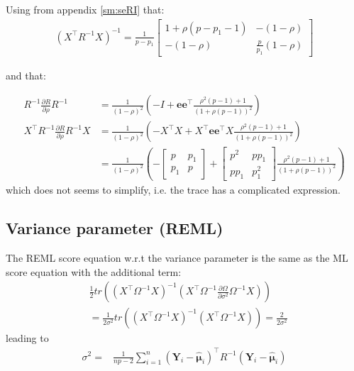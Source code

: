 \documentclass[12pt]{article}
\newcommand\Ve{\mathbf{e}}
\newcommand\VY{\mathbf{Y}}
\newcommand\Vmu{\boldsymbol{\mu}}
\newcommand\trans[1]{{#1}^\intercal}%
\begin{document}
Using from appendix \ref{sm:seRI} that:
\begin{align*}
\left(\trans{X}R^{-1}X\right)^{-1} = \frac{1}{p-p_1} \begin{bmatrix} 1+\rho (p-p_1-1)
                  & -(1-\rho)
                  \\ -(1-\rho)
                  & \frac{p}{p_1}(1-\rho)
                  \end{bmatrix}
\end{align*}

and that:

\begin{align*}
R^{-1} \frac{\partial R}{\partial\rho} R^{-1} &= \frac{1}{(1-\rho)^2} \left(-I + \Ve\trans{\Ve} \frac{\rho^2(p-1) + 1}{(1+\rho(p-1))^2}\right) \\
\trans{X}R^{-1} \frac{\partial R}{\partial\rho} R^{-1} X &= \frac{1}{(1-\rho)^2} \left(-\trans{X}X + \trans{X}\Ve\trans{\Ve}X \frac{\rho^2(p-1) + 1}{(1+\rho(p-1))^2}\right)  \\
&= \frac{1}{(1-\rho)^2} \left(-\begin{bmatrix} p
                  & p_1
                  \\ p_1
                  & p
                  \end{bmatrix}
                  + \begin{bmatrix} p^2
                  & p p_1
                  \\ p p_1
                  & p_1^2
                  \end{bmatrix} \frac{\rho^2(p-1) + 1}{(1+\rho(p-1))^2}\right) 
\end{align*}
which does not seems to simplify, i.e. the trace has a complicated expression.

\subsection{Variance parameter (REML)}
\label{sec:orgabe1d79}

The REML score equation w.r.t the variance parameter is the same as the ML score equation with the additional term:
\begin{align*}
&\frac{1}{2} tr\left(\left(\trans{X}\Omega^{-1}X\right)^{-1} \left(\trans{X}\Omega^{-1}\frac{\partial \Omega}{\partial\sigma^2}\Omega^{-1}X \right) \right) \\
&= \frac{1}{2\sigma^2} tr\left(\left(\trans{X}\Omega^{-1}X\right)^{-1} \left(\trans{X}\Omega^{-1}X \right) \right) = \frac{2}{2\sigma^2}
\end{align*}
leading to
\begin{align*}
\sigma^2 =& \frac{1}{n p - 2} \sum_{i=1}^n \trans{(\VY_i-\widehat{\Vmu}_i)} R^{-1} (\VY_i-\widehat{\Vmu}_i) 
\end{align*}
\end{document}
